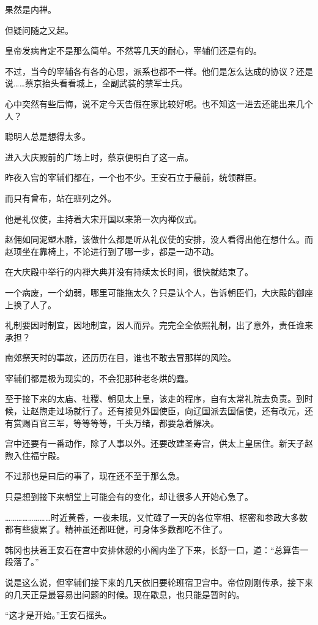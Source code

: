 果然是内禅。

但疑问随之又起。

皇帝发病肯定不是那么简单。不然等几天的耐心，宰辅们还是有的。

不过，当今的宰辅各有各的心思，派系也都不一样。他们是怎么达成的协议？还是说……蔡京抬头看看城上，全副武装的禁军士兵。

心中突然有些后悔，说不定今天告假在家比较好呢。也不知这一进去还能出来几个人？

聪明人总是想得太多。

进入大庆殿前的广场上时，蔡京便明白了这一点。

昨夜入宫的宰辅们都在，一个也不少。王安石立于最前，统领群臣。

而只有曾布，站在班列之外。

他是礼仪使，主持着大宋开国以来第一次内禅仪式。

赵佣如同泥塑木雕，该做什么都是听从礼仪使的安排，没人看得出他在想什么。而赵顼坐在靠椅上，不论进行到了哪一步，都是一动不动。

在大庆殿中举行的内禅大典并没有持续太长时间，很快就结束了。

一个病废，一个幼弱，哪里可能拖太久？只是认个人，告诉朝臣们，大庆殿的御座上换了人了。

礼制要因时制宜，因地制宜，因人而异。完完全全依照礼制，出了意外，责任谁来承担？

南郊祭天时的事故，还历历在目，谁也不敢去冒那样的风险。

宰辅们都是极为现实的，不会犯那种老冬烘的蠢。

至于接下来的太庙、社稷、朝见太上皇，该走的程序，自有太常礼院去负责。到时候，让赵煦走过场就行了。还有接见外国使臣，向辽国派去国信使，还有改元，还有赏赐百官三军，等等等等，千头万绪，都要急着解决。

宫中还要有一番动作，除了人事以外。还要改建圣寿宫，供太上皇居住。新天子赵煦入住福宁殿。

不过那也是曰后的事了，现在还不至于那么急。

只是想到接下来朝堂上可能会有的变化，却让很多人开始心急了。

……………………时近黄昏，一夜未眠，又忙碌了一天的各位宰相、枢密和参政大多数都有些疲累了。精神虽还都旺健，可身体多数都吃不住了。

韩冈也扶着王安石在宫中安排休憩的小阁内坐了下来，长舒一口，道：“总算告一段落了。”

说是这么说，但宰辅们接下来的几天依旧要轮班宿卫宫中。帝位刚刚传承，接下来的几天正是最容易出问题的时候。现在歇息，也只能是暂时的。

“这才是开始。”王安石摇头。

